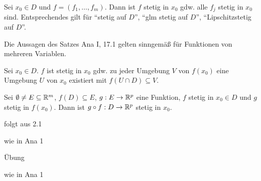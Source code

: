 \documentclass[a4paper,twoside,DIV15,BCOR12mm,chapterprefix=true,headings=twolinechapter]{scrbook}
\begin{document}
\begin{satz}
\begin{liste}
\item Sei $x_0 \in D$ und $f = (f_1,\ldots,f_m).$ Dann ist $f$ stetig in $x_0$ gdw. alle $f_j$ stetig in $x_0$ sind. Entsprechendes gilt für "`stetig auf $D$"', "`glm stetig auf $D$"', "`Lipschitzstetig auf $D$"'.
\item Die Aussagen des Satzes Ana I, 17.1 gelten sinngemäß für Funktionen von mehreren Variablen.
\item Sei $x_0 \in D$. $f$ ist stetig in $x_0$ gdw. zu jeder Umgebung $V$ von $f(x_0)$ eine Umgebung $U$ von $x_0$ existiert mit $f(U \cap D) \subseteq V$.
\item Sei $\emptyset \ne E \subseteq \mathbb{R}^m$, $f(D) \subseteq E$, $g: E \to \mathbb{R}^p$ eine Funktion, $f$ stetig in $x_0 \in D$ und $g$ stetig in $f(x_0)$. Dann ist $g \circ f: D \to \mathbb{R}^p$ stetig in $x_0$.
\end{liste}
\end{satz}

\begin{beweise}
\item folgt aus 2.1
\item wie in Ana 1
\item Übung
\item wie in Ana 1
\end{beweise}
\end{document}
